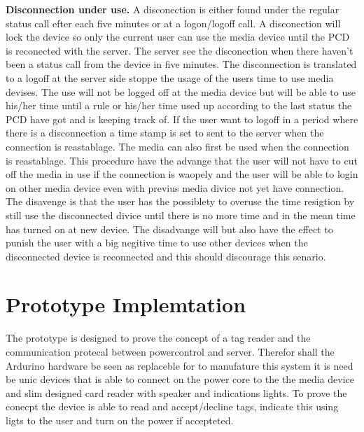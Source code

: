 \textbf{Disconnection under use.} \n
A disconection is either found under the regular status call efter each five minutes or at a logon/logoff call. A disconection will lock the device so only the current user can use the media device until the PCD is reconected with the server. The server see the disconection when there haven't been a status call from the device in five minutes. The disconnection is translated to a logoff at the server side stoppe the usage of the users time to use media devises. The use will not be logged off at the media device but will be able to use his/her time until a rule or his/her time used up according to the last status the PCD have got and is keeping track of. If the user want to logoff in a period where there is a disconnection a time stamp is set to sent to the server when the connection is reastablage. The media can also first be used when the connection is reastablage.   
This procedure have the advange that the user will not have to cut off the media in use if the connection is waopely and the user will be able to login on other media device even with previus media divice not yet have connection. 
The disavenge is that the user has the possiblety to overuse the time resigtion by still use the disconnected divice until there is no more time and in the mean time has turned on at new device. 
The disadvange will but also have the effect to punish the user with a big negitive time to use other devices when the disconnected device is reconnected and this should discourage this senario.       
    



\section{Prototype Implemtation}
The prototype is designed to prove the concept of a tag reader and the communication protecal between powercontrol and server. Therefor shall the Ardurino hardware be seen as replaceble for to manufature this system it is need be unic devices that is able to connect on the power core to the the media device and slim designed card reader with speaker and indications lights. To prove the conecpt the device is able to read and accept/decline tags, indicate this using ligts to the user and turn on the power if accepteted.   




    